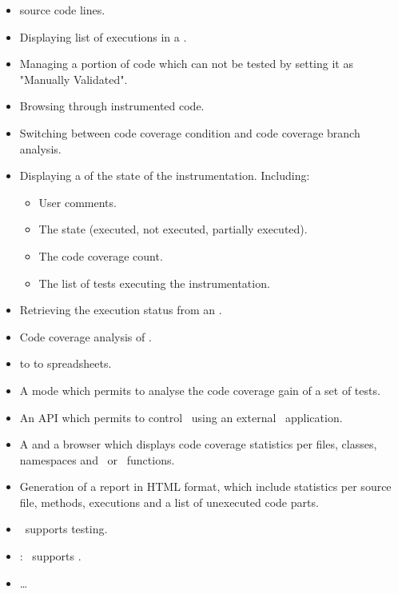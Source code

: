    \begin{itemize}
     \item {} source code lines.
     \item Displaying list of executions in a .
     \item Managing a portion of code which can not be tested by setting it as "Manually Validated".
     \item Browsing through instrumented code.
     \item Switching between code coverage condition and code coverage branch analysis.
     \item Displaying a
            of the state of the instrumentation. Including:
             \begin{itemize}
             \item User comments.
             \item The state (executed, not executed, partially executed).
             \item The code coverage count.
             \item The list of tests executing the instrumentation.
             \end{itemize}
     \item Retrieving the execution status from an .
     \item Code coverage analysis of .
     \item {} to to spreadsheets.
     \item A  mode which permits 
           to analyse the code coverage gain of a set of tests.
     \item An API which permits to control 
           \CoverageBrowser\ using an external \CorCPlusPlus\ application.
     \item A  
           and a  browser which
           displays code coverage statistics per files, classes, namespaces and \CorCPlusPlus\ or \CSharp\ functions.
     \item Generation of a report in HTML format, which include statistics per source file, methods, executions and 
           a list of unexecuted code parts. %
     \item \CoverageBrowser\ supports  testing. 
     \item \NewFeature: \CoverageBrowser\ supports . 
     \item \ldots
   \end{itemize}
